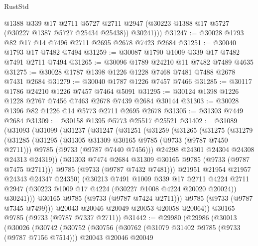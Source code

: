 \begin{lexlean}{RustStd}
\begin{coremodule}
          @1388
          @339
          @17
          @2711
          @5727
          @2711
          @2947
          (@30223 @1388 @17 @5727 (@30227 @1387 @5727 @25434 @25438))
          @30241)))
@31247 := @30028 @1793 @82 @17 @14 @7496 @2711 @2695 @2678 @7423 @2684
@31251 := @30040 @1793 @17 @7482 @7494
@31259 := @30087 @1790 @1009 @339 @17 @7482 @7491 @2711 @7494
@31265 := @30096 @1789 @24210 @11 @7482 @7489 @4635
@31275 := @30028 @1787 @1398 @1226 @1228 @7468 @7481 @7488 @2678 @7431 @2684
@31279 := @30040 @1787 @1226 @7457 @7466
@31285 := @30117 @1786 @24210 @1226 @7457 @7464 @5091
@31295 := @30124 @1398 @1226 @1228 @2767 @7456 @7463 @2678 @7439 @2684 @30144
@31303 := @30028 @1396 @82 @1226 @14 @5773 @2711 @2695 @2678
@31305 := @31303 @7449 @2684
@31309 := @30158 @1395 @5773 @25517 @25521
@31402 := @31089
    (@31093
      (@31099
        (@31237
          (@31247
            (@31251
              (@31259
                (@31265
                  (@31275
                    (@31279
                      (@31285
                        (@31295
                          (@31305 @31309 @30165 @9785 (@9733 (@9787 @7450 @2711)))
                          @9785
                          (@9733 (@9787 @7440 @7456)))
                        @24298
                        @24301
                        @24304
                        @24308
                        @24313
                        @24319))
                    (@31303 @7474 @2684 @31309 @30165 @9785 (@9733 (@9787 @7475 @2711)))
                    @9785
                    (@9733 (@9787 @7432 @7481)))
                  @21951
                  @21954
                  @21957
                  @24343
                  @24347
                  @24350)
                (@30213
                  @7491
                  @1009
                  @339
                  @17
                  @2711
                  @4224
                  @2711
                  @2947
                  (@30223 @1009 @17 @4224 (@30227 @1008 @4224 @20020 @20024))
                  @30241)))
            @30165
            @9785
            (@9733 (@9787 @7424 @2711)))
          @9785
          (@9733 (@9787 @7345 @7499)))
        @20043
        @20046
        @20049
        @20053
        @20058
        @20064))
    @30165
    @9785
    (@9733 (@9787 @7337 @2711))
@31442 := @29980
    (@29986
      (@30013
        (@30026
          (@30742
            (@30752
              (@30756
                (@30762
                  (@31079 @31402 @9785 (@9733 (@9787 @7156 @7514)))
                  @20043
                  @20046
                  @20049

\end{coremodule}
\end{lexlean}
